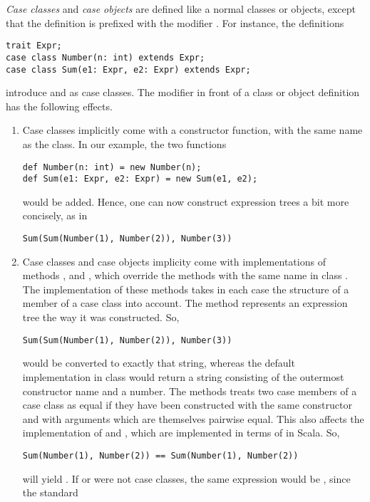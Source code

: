 \documentclass[a4paper,12pt,twoside,titlepage]{book}
\begin{document}
{\em Case classes} and {\em case objects} are defined like a normal
classes or objects, except that the definition is prefixed with the modifier
.  For instance, the definitions
\begin{lstlisting}
trait Expr;
case class Number(n: int) extends Expr;
case class Sum(e1: Expr, e2: Expr) extends Expr;
\end{lstlisting}
introduce  and  as case classes.
The  modifier in front of a class or object 
definition has the following effects.
\begin{enumerate}
\item Case classes implicitly come with a constructor function, with the same name as the class. In our example, the two functions
\begin{lstlisting}
def Number(n: int) = new Number(n);
def Sum(e1: Expr, e2: Expr) = new Sum(e1, e2);
\end{lstlisting}
would be added. Hence, one can now construct expression trees a bit more concisely, as in
\begin{lstlisting}
Sum(Sum(Number(1), Number(2)), Number(3))
\end{lstlisting} 
\item Case classes and case objects 
implicity come with implementations of methods
,  and , which override the
methods with the same name in class . The implementation
of these methods takes in each case the structure of a member of a
case class into account. The  method represents an
expression tree the way it was constructed. So,
\begin{lstlisting}
Sum(Sum(Number(1), Number(2)), Number(3))
\end{lstlisting} 
would be converted to exactly that string, whereas the default
implementation in class  would return a string consisting
of the outermost constructor name  and a number.  The
 methods treats two case members of a case class as equal
if they have been constructed with the same constructor and with
arguments which are themselves pairwise equal. This also affects the
implementation of \code{==} and \code{!=}, which are implemented in
terms of  in Scala. So,
\begin{lstlisting}
Sum(Number(1), Number(2)) == Sum(Number(1), Number(2))
\end{lstlisting}
will yield . If  or  were not case
classes, the same expression would be , since the standard

\end{enumerate}
\end{document}
